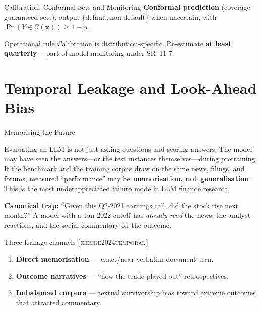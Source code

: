 \documentclass[9pt,t]{beamer}
\newcommand{\citesrc}[1]{\textsc{\small #1}}
\providecommand{\citep}[1]{{\footnotesize[\,\citesrc{#1}\,]}}
\begin{document}
\begin{frame}{Calibration: Conformal Sets and Monitoring}
\textbf{Conformal prediction} (coverage-guaranteed sets): output
$\{\text{default}, \text{non-default}\}$ when uncertain, with
$\Pr(Y \in \mathcal{C}(\mathbf{x})) \geq 1-\alpha$.

\medskip
\begin{alertblock}{Operational rule}
Calibration is distribution-specific. Re-estimate \textbf{at least quarterly}---
part of model monitoring under SR~11-7.
\end{alertblock}
\end{frame}

\section{Temporal Leakage and Look-Ahead Bias}

\begin{frame}{Memorising the Future}
\begin{bigpicture}
Evaluating an LLM is not just asking questions and scoring answers. The model
may have seen the answers---or the test instances themselves---during
pretraining. If the benchmark and the training corpus draw on the same news,
filings, and forums, measured ``performance'' may be \textbf{memorisation, not
generalisation}. This is the most underappreciated failure mode in LLM finance
research.
\end{bigpicture}

\smallskip
\textbf{Canonical trap:} ``Given this Q2-2021 earnings call, did the stock rise
next month?'' A model with a Jan-2022 cutoff has \emph{already read} the news,
the analyst reactions, and the social commentary on the outcome.

\smallskip
\begin{block}{Three leakage channels \citep{ziemke2024temporal}}
\begin{enumerate}\itemsep1pt
  \item \textbf{Direct memorisation} --- exact/near-verbatim document seen.
  \item \textbf{Outcome narratives} --- ``how the trade played out'' retrospectives.
  \item \textbf{Imbalanced corpora} --- textual survivorship bias toward extreme
        outcomes that attracted commentary.
\end{enumerate}
\end{block}
\end{frame}
\end{document}
